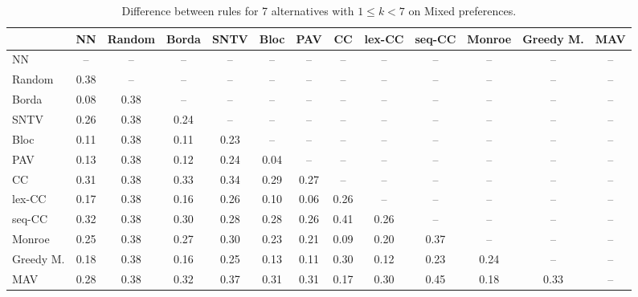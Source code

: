 
\begin{table*}[htbp]
\centering
\begin{tabular}{lcccccccccccc}
\toprule
 & NN & Random & Borda & SNTV & Bloc & PAV & CC & lex-CC & seq-CC & Monroe & Greedy M. & MAV \\
\midrule
NN & -- & -- & -- & -- & -- & -- & -- & -- & -- & -- & -- & -- \\
Random & \cellcolor{blue!38} 0.38 & -- & -- & -- & -- & -- & -- & -- & -- & -- & -- & -- \\
Borda & \cellcolor{blue!8} 0.08 & \cellcolor{blue!38} 0.38 & -- & -- & -- & -- & -- & -- & -- & -- & -- & -- \\
SNTV & \cellcolor{blue!26} 0.26 & \cellcolor{blue!38} 0.38 & \cellcolor{blue!24} 0.24 & -- & -- & -- & -- & -- & -- & -- & -- & -- \\
Bloc & \cellcolor{blue!11} 0.11 & \cellcolor{blue!38} 0.38 & \cellcolor{blue!11} 0.11 & \cellcolor{blue!23} 0.23 & -- & -- & -- & -- & -- & -- & -- & -- \\
PAV & \cellcolor{blue!13} 0.13 & \cellcolor{blue!38} 0.38 & \cellcolor{blue!12} 0.12 & \cellcolor{blue!24} 0.24 & \cellcolor{blue!4} 0.04 & -- & -- & -- & -- & -- & -- & -- \\
CC & \cellcolor{blue!31} 0.31 & \cellcolor{blue!38} 0.38 & \cellcolor{blue!33} 0.33 & \cellcolor{blue!34} 0.34 & \cellcolor{blue!28} 0.29 & \cellcolor{blue!27} 0.27 & -- & -- & -- & -- & -- & -- \\
lex-CC & \cellcolor{blue!17} 0.17 & \cellcolor{blue!38} 0.38 & \cellcolor{blue!16} 0.16 & \cellcolor{blue!26} 0.26 & \cellcolor{blue!10} 0.10 & \cellcolor{blue!6} 0.06 & \cellcolor{blue!26} 0.26 & -- & -- & -- & -- & -- \\
seq-CC & \cellcolor{blue!32} 0.32 & \cellcolor{blue!38} 0.38 & \cellcolor{blue!30} 0.30 & \cellcolor{blue!28} 0.28 & \cellcolor{blue!28} 0.28 & \cellcolor{blue!26} 0.26 & \cellcolor{blue!41} 0.41 & \cellcolor{blue!26} 0.26 & -- & -- & -- & -- \\
Monroe & \cellcolor{blue!25} 0.25 & \cellcolor{blue!38} 0.38 & \cellcolor{blue!27} 0.27 & \cellcolor{blue!30} 0.30 & \cellcolor{blue!23} 0.23 & \cellcolor{blue!21} 0.21 & \cellcolor{blue!9} 0.09 & \cellcolor{blue!20} 0.20 & \cellcolor{blue!37} 0.37 & -- & -- & -- \\
Greedy M. & \cellcolor{blue!18} 0.18 & \cellcolor{blue!38} 0.38 & \cellcolor{blue!16} 0.16 & \cellcolor{blue!25} 0.25 & \cellcolor{blue!13} 0.13 & \cellcolor{blue!11} 0.11 & \cellcolor{blue!30} 0.30 & \cellcolor{blue!12} 0.12 & \cellcolor{blue!23} 0.23 & \cellcolor{blue!24} 0.24 & -- & -- \\
MAV & \cellcolor{blue!28} 0.28 & \cellcolor{blue!38} 0.38 & \cellcolor{blue!32} 0.32 & \cellcolor{blue!37} 0.37 & \cellcolor{blue!31} 0.31 & \cellcolor{blue!31} 0.31 & \cellcolor{blue!17} 0.17 & \cellcolor{blue!30} 0.30 & \cellcolor{blue!45} 0.45 & \cellcolor{blue!18} 0.18 & \cellcolor{blue!33} 0.33 & -- \\
\bottomrule
\end{tabular}

\caption{Difference between rules for 7 alternatives with $1 \leq k < 7$ on Mixed preferences.}
\label{tab:rule_distance_heatmap-m=[7]-pref_dist=mixed}
\end{table*}
    